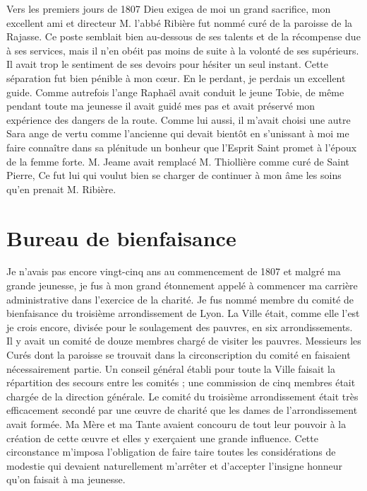 \documentclass[11pt,a4paper]{report}
\begin{document}
Vers les premiers jours de 1807 Dieu exigea de moi un grand sacrifice, mon excellent ami et directeur M. l'abbé Ribière fut nommé curé de la paroisse de la Rajasse. Ce poste semblait bien au-dessous de ses talents et de la récompense due à ses services, mais il n'en obéit pas moins de suite à la volonté de ses supérieurs. Il avait trop le sentiment de ses devoirs pour hésiter un seul instant. Cette séparation fut bien pénible à mon cœur. En le perdant, je perdais un excellent guide. Comme autrefois l'ange Raphaël avait conduit le jeune Tobie, de même pendant toute ma jeunesse il avait guidé mes pas et avait préservé mon expérience des dangers de la route. Comme lui aussi, il m'avait choisi une autre Sara ange de vertu comme l'ancienne qui devait bientôt en s'unissant à moi me faire connaître dans sa plénitude un bonheur que l'Esprit Saint promet à l'époux de la femme forte. M. Jeame avait remplacé M. Thiollière comme curé de Saint Pierre, Ce fut lui qui voulut bien se charger de continuer à mon âme les soins qu'en prenait M. Ribière.

\section*{Bureau de bienfaisance}

Je n'avais pas encore vingt-cinq ans au commencement de 1807 et malgré ma grande jeunesse, je fus à mon grand étonnement appelé à commencer ma carrière administrative dans l'exercice de la charité. Je fus nommé membre du comité de bienfaisance du troisième arrondissement de Lyon. La Ville était, comme elle l'est je crois encore, divisée pour le soulagement des pauvres, en six arrondissements. Il y avait un comité de douze membres chargé de visiter les pauvres. Messieurs les Curés dont la paroisse se trouvait dans la circonscription du comité en faisaient nécessairement partie. Un conseil général établi pour toute la Ville faisait la répartition des secours entre les comités ; une commission de cinq membres était chargée de la direction générale. Le comité du troisième arrondissement était très efficacement secondé par une œuvre de charité que les dames de l'arrondissement avait formée. Ma Mère et ma Tante avaient concouru de tout leur pouvoir à la création de cette œuvre et elles y exerçaient une grande influence. Cette circonstance m'imposa l'obligation de faire taire toutes les considérations de modestie qui devaient naturellement m'arrêter et d'accepter l'insigne honneur qu'on faisait à ma jeunesse.
\end{document}
